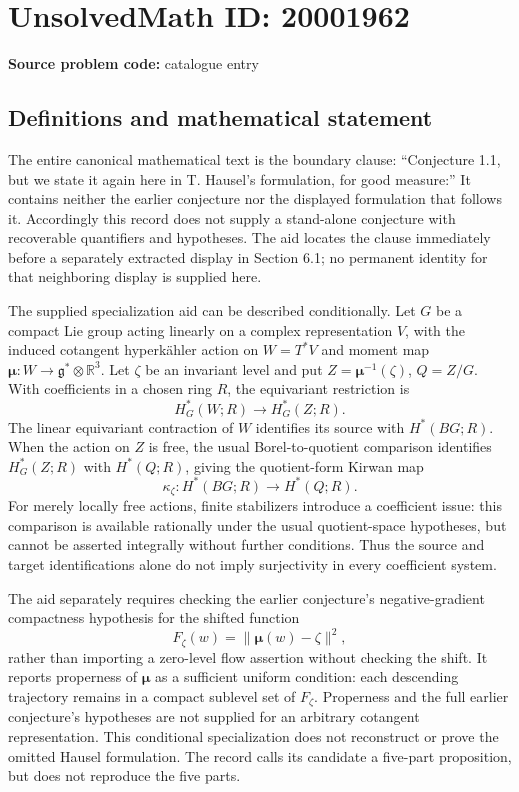 \documentclass[11pt]{article}
\newcommand{\R}{\mathbb{R}}
\begin{document}
\section*{UnsolvedMath ID: 20001962}
\textbf{Source problem code:} catalogue entry
\subsection{Definitions and mathematical statement}
The entire canonical mathematical text is the boundary clause: ``Conjecture 1.1, but we state it again here in T. Hausel's formulation, for good measure:'' It contains neither the earlier conjecture nor the displayed formulation that follows it. Accordingly this record does not supply a stand-alone conjecture with recoverable quantifiers and hypotheses. The aid locates the clause immediately before a separately extracted display in Section 6.1; no permanent identity for that neighboring display is supplied here.

The supplied specialization aid can be described conditionally. Let \(G\) be a compact Lie group acting linearly on a complex representation \(V\), with the induced cotangent hyperkähler action on \(W=T^*V\) and moment map \(\boldsymbol\mu:W\to\mathfrak g^*\otimes\R^3\). Let \(\zeta\) be an invariant level and put \(Z=\boldsymbol\mu^{-1}(\zeta)\), \(Q=Z/G\). With coefficients in a chosen ring \(R\), the equivariant restriction is
\[
 H_G^*(W;R)\longrightarrow H_G^*(Z;R).
\]
The linear equivariant contraction of \(W\) identifies its source with \(H^*(BG;R)\). When the action on \(Z\) is free, the usual Borel-to-quotient comparison identifies \(H_G^*(Z;R)\) with \(H^*(Q;R)\), giving the quotient-form Kirwan map
\[
 \kappa_\zeta:H^*(BG;R)\longrightarrow H^*(Q;R).
\]
For merely locally free actions, finite stabilizers introduce a coefficient issue: this comparison is available rationally under the usual quotient-space hypotheses, but cannot be asserted integrally without further conditions. Thus the source and target identifications alone do not imply surjectivity in every coefficient system.

The aid separately requires checking the earlier conjecture's negative-gradient compactness hypothesis for the shifted function
\[
 F_\zeta(w)=\|\boldsymbol\mu(w)-\zeta\|^2,
\]
rather than importing a zero-level flow assertion without checking the shift. It reports properness of \(\boldsymbol\mu\) as a sufficient uniform condition: each descending trajectory remains in a compact sublevel set of \(F_\zeta\). Properness and the full earlier conjecture's hypotheses are not supplied for an arbitrary cotangent representation. This conditional specialization does not reconstruct or prove the omitted Hausel formulation. The record calls its candidate a five-part proposition, but does not reproduce the five parts.
\end{document}
